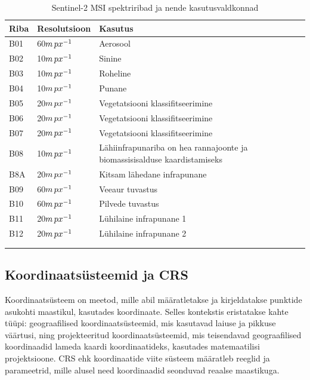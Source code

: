 \begin{longtable}{llll}
    \hline
    Riba & Resolutsioon & Kasutus                          \\ 
    \hline
    B01  & 60$m \mkern3mu px^{-1}$        & Aerosool                         \\
    B02  & 10$m \mkern3mu px^{-1}$        & Sinine                           \\
    B03  & 10$m \mkern3mu px^{-1}$        & Roheline                         \\
    B04  & 10$m \mkern3mu px^{-1}$        & Punane                           \\
    B05  & 20$m \mkern3mu px^{-1}$        & Vegetatsiooni klassifitseerimine \\
    B06  & 20$m \mkern3mu px^{-1}$        & Vegetatsiooni klassifitseerimine \\
    B07  & 20$m \mkern3mu px^{-1}$        & Vegetatsiooni klassifitseerimine \\
    B08  & 10$m \mkern3mu px^{-1}$        & Lähiinfrapunariba on hea rannajoonte ja biomassisisalduse kaardistamiseks \\
    B8A  & 20$m \mkern3mu px^{-1}$        & Kitsam lähedane infrapunane  \\
    B09  & 60$m \mkern3mu px^{-1}$        & Veeaur tuvastus                       \\
    B10  & 60$m \mkern3mu px^{-1}$        & Pilvede tuvastus                      \\
    B11  & 20$m \mkern3mu px^{-1}$        & Lühilaine infrapunane 1      \\
    B12  & 20$m \mkern3mu px^{-1}$        & Lühilaine infrapunane 2      \\
         &              &                    &                              \\ \hline
    \caption{Sentinel-2 MSI spektriribad ja nende kasutusvaldkonnad}
    \label{tab:s2bands}
\end{longtable}

\subsection{Koordinaatsüsteemid ja CRS}
Koordinaatsüsteem on meetod, mille abil määratletakse ja kirjeldatakse punktide
asukohti maastikul, kasutades koordinaate. Selles kontekstis eristatakse kahte
tüüpi: geograafilised koordinaatsüsteemid, mis kasutavad laiuse ja pikkuse
väärtusi, ning projekteeritud koordinaatsüsteemid, mis teisendavad
geograafilised koordinaadid lameda kaardi koordinaatideks, kasutades
matemaatilisi projektsioone. CRS ehk koordinaatide viite süsteem määratleb
reeglid ja parameetrid, mille alusel need koordinaadid seonduvad reaalse
maastikuga. \cite{8CoordinateReference}

